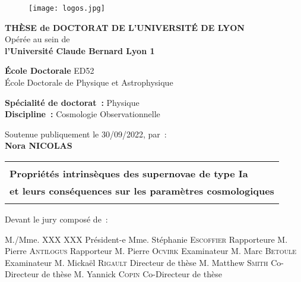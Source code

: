 \documentclass[../main/main.tex]{subfiles}
\begin{document}
\frontmatter

\begin{titlepage}
    \begin{center}
        \begin{figure}[h]
            \centering
            \texttt{[image: logos.jpg]}
        \end{figure}

        \vfill

        {\large\bfseries THÈSE de DOCTORAT DE L'UNIVERSITÉ DE LYON\\}
        {Opérée au sein de\\}
        {\large \bfseries l'Université Claude Bernard Lyon 1\\}
        \bigbreak

        {\large \textbf{École Doctorale} ED52\\
        École Doctorale de Physique et Astrophysique}
        \bigbreak

        {\large \textbf{Spécialité de doctorat~:} Physique \\}
        {\large \textbf{Discipline~:} Cosmologie Observationnelle}

        \vfill

        {Soutenue publiquement le 30/09/2022, par~:\\}
        {\Large\bfseries {Nora NICOLAS}\\}
        \vspace{0.5cm}
        \begin{adjustwidth}{-10pt}{-10pt}
        \begin{tabularx}{\linewidth}{Y}
            \toprule
            \\
            \Large \bfseries Propriétés intrinsèques des supernovae de type Ia\\
            \Large \bfseries et leurs conséquences sur les paramètres
            cosmologiques\\
            \\[-0.2em]
            \bottomrule
        \end{tabularx}
        \end{adjustwidth}

        \vfill

    \end{center}

\vfill

Devant le jury composé de~: \bigbreak

M./Mme. XXX XXX \hfill Président-e\smallbreak
Mme. Stéphanie \textsc{Escoffier} \hfill Rapporteure\smallbreak
M. Pierre \textsc{Antilogus} \hfill Rapporteur\smallbreak
M. Pierre \textsc{Ocvirk} \hfill Examinateur\smallbreak
M. Marc \textsc{Betoule} \hfill Examinateur\smallbreak
M. Mickaël \textsc{Rigault} \hfill Directeur de thèse\smallbreak
M. Matthew \textsc{Smith} \hfill Co-Directeur de thèse\smallbreak
M. Yannick \textsc{Copin} \hfill Co-Directeur de thèse\smallbreak

\vfill

\end{titlepage}
\end{document}
